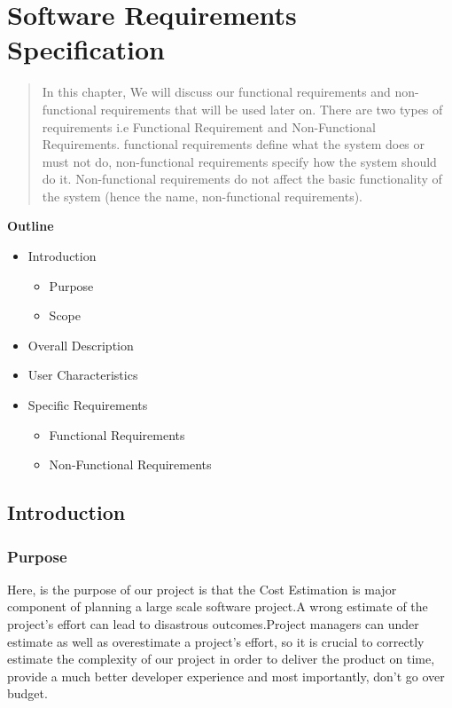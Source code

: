
\section{Software Requirements Specification}

\vspace{20mm}



\begin{abstract}
	In this chapter, We will discuss our
    functional requirements and non-functional
    requirements that will be used later on. There are two types of 
    requirements i.e Functional Requirement and Non-Functional Requirements.
    functional requirements define what the system does or must not do, non-functional
    requirements specify how the system should do it. Non-functional requirements do not
    affect the basic functionality of the system (hence the name, non-functional requirements).
    
\end{abstract}

\vspace{20mm}

\large{\textbf{Outline}}

\begin{center}
	\begin{itemize}
		\item Introduction
		\begin{itemize}
            \item Purpose
            \item Scope
        \end{itemize}
		\item Overall Description
		\item User Characteristics
		\item Specific Requirements
        \begin{itemize}
            \item Functional Requirements
            \item Non-Functional Requirements
        \end{itemize}
	\end{itemize}
\end{center}
\pagebreak


\subsection{Introduction}

    \subsubsection{Purpose}
    Here, is the purpose of our project is that the Cost Estimation is major component
    of planning a large scale software project.A wrong estimate of the project’s effort
    can lead to disastrous outcomes.Project managers can under estimate as well as 
    overestimate a project’s effort, so it is crucial to correctly estimate the 
    complexity of our project in order to deliver the product on time, provide a 
    much better developer experience and most importantly, don’t go over budget.



